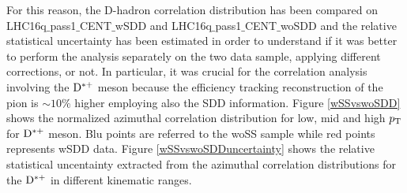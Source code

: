 For this reason, the D-hadron correlation distribution has been compared on LHC16q$\_$pass1$\_$CENT$\_$wSDD and LHC16q$\_$pass1$\_$CENT$\_$woSDD and the relative statistical uncertainty has been estimated in order to understand if it was better to perform the analysis separately on the two data sample, applying different corrections, or not.
In particular, it was crucial for the correlation analysis involving the ${\rm D^{*+}}$ meson because the efficiency tracking reconstruction of the pion is $\sim10\%$ higher employing also the SDD information.
Figure \ref{wSSvswoSDD} shows the normalized azimuthal correlation distribution for low, mid and high $p_{\rm T}$ for ${\rm D^{*+}}$ meson. Blu points are referred to the woSS sample while red points represents wSDD data. Figure \ref{wSSvswoSDDuncertainty} shows the relative statistical uncentainty extracted from the azimuthal correlation distributions for the ${\rm D^{*+}}$ in different kinematic ranges.

